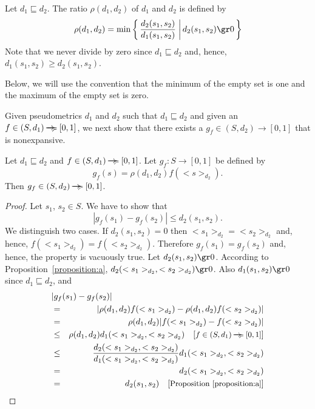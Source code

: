 \documentclass{LMCS}
\newcommand{\ndi}{\mathbin{\raisebox{0.15ex}{-\hspace{-0.2em}-\hspace{-0.2em}-\hspace{-0.2em}-\hspace{-0.2em}-\hspace{-0.2em}-}\hspace{-0.7em}\succcurlyeq}}
\newcommand{\comment}[1]{\hspace{1em}\mbox{[{\small #1}]}}
\newcommand{\bigmid}{\; \bigg| \,}
\begin{document}
Let $d_1 \sqsubseteq d_2$.  The ratio $\rho(d_1, d_2)$
of $d_1$ and $d_2$ is defined by
\begin{displaymath}
\rho(d_1, d_2)
=
\min \left \{\, \frac{d_2(s_1, s_2)}{d_1(s_1, s_2)} \bigmid d_2(s_1, s_2) \gr 0  \, \right \}
\end{displaymath}
Note that we never divide by zero since $d_1 \sqsubseteq d_2$
and, hence, $d_1(s_1, s_2) \geq d_2(s_1, s_2)$.  

Below, we will use the convention that the minimum of 
the empty set is one and the maximum of the empty set is zero.

Given pseudometrics $d_1$ and $d_2$ such that $d_1 \sqsubseteq d_2$ and
given an $f \in (S, d_1) \ndi [0, 1]$, we next show that there
exists a $g_f \in (S, d_2) \to [0, 1]$ that is nonexpansive.

\begin{prop}
\label{proposition:b}
Let $d_1 \sqsubseteq d_2$ and $f \in (S, d_1) \ndi [0, 1]$.
Let $g_f : S \to [0, 1]$ be defined by
\begin{displaymath}
g_f(s) = \rho(d_1, d_2) f(<s>_{d_2}).
\end{displaymath}
Then $g_f \in (S, d_2) \ndi [0, 1]$.
\end{prop}
\begin{proof}
Let $s_1$, $s_2 \in S$.  We have to show that
\begin{displaymath}
| g_f(s_1) - g_f(s_2) | \leq d_2(s_1, s_2).
\end{displaymath}
We distinguish two cases.  If $d_2(s_1, s_2) = 0$ then
$<s_1>_{d_2} = <s_2>_{d_2}$ and, hence, $f(<s_1>_{d_2}) = f(<s_2>_{d_2})$.
Therefore $g_f(s_1) = g_f(s_2)$ and, hence, the property is vacuously
true.  Let $d_2(s_1, s_2) \gr 0$.  According to 
Proposition~\ref{proposition:a}, $d_2(<s_1>_{d_2}, <s_2>_{d_2}) \gr 0$.
Also $d_1(s_1, s_2) \gr 0$ since $d_1 \sqsubseteq d_2$, and
\begin{eqnarray*}
\lefteqn{| g_f(s_1) - g_f(s_2) |}\\
& = & | \rho(d_1, d_2) f(<s_1>_{d_2}) - \rho(d_1, d_2) f(<s_2>_{d_2}) |\\
& = & \rho(d_1, d_2) | f(<s_1>_{d_2}) - f(<s_2>_{d_2}) |\\
& \leq &  \rho(d_1, d_2) d_1(<s_1>_{d_2}, <s_2>_{d_2})
\comment{$f \in (S, d_1) \ndi [0, 1]$}\\
& \leq & \frac{d_2(<s_1>_{d_2}, <s_2>_{d_2})}{d_1(<s_1>_{d_2}, <s_2>_{d_2})} d_1(<s_1>_{d_2}, <s_2>_{d_2})\\
& = & d_2(<s_1>_{d_2}, <s_2>_{d_2})\\
& = & d_2(s_1, s_2)
\comment{Proposition~\ref{proposition:a}}
\end{eqnarray*}
\end{proof}
\end{document}
